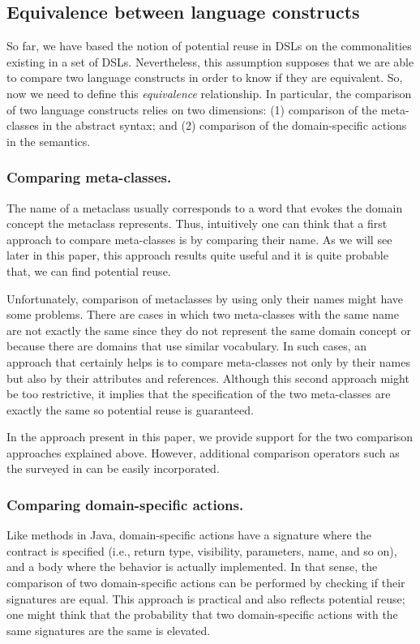 
\subsection{Equivalence between language constructs}

So far, we have based the notion of potential reuse in DSLs on the commonalities existing in a set of DSLs. Nevertheless, this assumption supposes that we are able to compare two language constructs in order to know if they are equivalent. So, now we need to define this \textit{equivalence} relationship. In particular, the comparison of two language constructs relies on two dimensions: (1) comparison of the meta-classes in the abstract syntax; and (2) comparison of the domain-specific actions in the semantics.

\vspace{-2mm}
\subsubsection{Comparing meta-classes.} The name of a metaclass usually corresponds to a word that evokes the domain concept the metaclass represents. Thus, intuitively one can think that a first approach to compare meta-classes is by comparing their name. As we will see later in this paper, this approach results quite useful and it is quite probable that, we can find potential reuse.

Unfortunately, comparison of metaclasses by using only their names might have some problems. There are cases in which two meta-classes with the same name are not exactly the same since they do not represent the same domain concept or because there are domains that use similar vocabulary. In such cases, an approach that certainly helps is to compare meta-classes not only by their names but also by their attributes and references. Although this second approach might be too restrictive, it implies that the specification of the two meta-classes are exactly the same so potential reuse is guaranteed. 

In the approach present in this paper, we provide support for the two comparison approaches explained above. However, additional comparison operators such as the surveyed in \cite{Lafi:2011} can be easily incorporated.

\vspace{-2mm}
\subsubsection{Comparing domain-specific actions.} Like methods in Java, domain-specific actions have a signature where the contract is specified (i.e., return type, visibility, parameters, name, and so on), and a body where the behavior is actually implemented. In that sense, the comparison of two domain-specific actions can be performed by checking if their signatures are equal. This approach is practical and also reflects potential reuse; one might think that the probability that two domain-specific actions with the same signatures are the same is elevated. 

